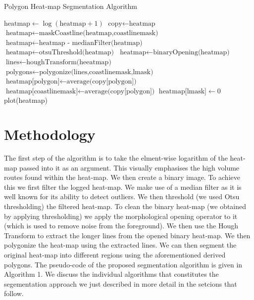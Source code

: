 \documentclass{article}
\begin{document}
\begin{algorithm}
 \caption{Polygon Heat-map Segmentation Algorithm}\label{euclid}
 \begin{algorithmic}[1]
 \State $\textrm{heatmap} \gets \log(\textrm{heatmap}+1)$
 \State $\textrm{copy} \gets \textrm{heatmap}$
 \State $\textrm{heatmap} \gets \textrm{maskCoastline(heatmap,coastlinemask)}$
 \State $\textrm{heatmap} \gets \textrm{heatmap - medianFilter(heatmap)}$ 
 \State $\textrm{heatmap} \gets \textrm{otsuThreshold(heatmap)}$
 \State $\textrm{heatmap} \gets \textrm{binaryOpening(heatmap)}$
 \State $\textrm{lines} \gets \textrm{houghTransform(heeatmap)}$
 \State $\textrm{polygons} \gets \textrm{polygonize(lines,coastlinemask,lmask)}$
     \State $\textrm{heatmap[polygon]} \gets \textrm{average(copy[polygon])}$ 
 \EndFor
 \State $\textrm{heatmap[coastlinemask]} \gets \textrm{average(copy[polygon])}$
 \State $\textrm{heatmap[lmask]} \gets 0$
 \State plot(heatmap)
 
 \EndProcedure
 \end{algorithmic}
 \end{algorithm}
\section{Methodology}
The first step of the algorithm is to take the elment-wise logarithm of the heat-map passed into it as an argument. This visually emphasises the high volume routes found within the heat-map. We then 
create a binary image. To achieve this we first filter the logged heat-map. We make use of a median filter as it is well known for its ability to detect outliers. We then threshold (we used Otsu thresholding) the  
filtered heat-map. To clean the binary heat-map (we obtained by applying thresholding) we apply the morphological opening operator to it (which is used to remove noise from the foreground).
We then use the Hough Transform to extract the longer lines from the opened binary heat-map. We then polygonize the heat-map using the extracted lines. We can then 
segment the original heat-map into different regions using the aforementioned derived polygons. The pseudo-code of the proposed segmentation algorithm is given in Algorithm 1. We discuss the individual algorithms that constitutes the segementation approach we 
just described in more detail in the setcions that follow.  
\end{document}
